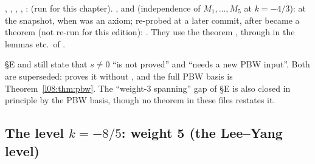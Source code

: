\begin{status}
\allowbreak{}\allowbreak{}\allowbreak{}, \allowbreak{}\allowbreak{}\allowbreak{}\allowbreak{}\allowbreak{}, \allowbreak{}\allowbreak{}\allowbreak{},
\allowbreak{}\allowbreak{}\allowbreak{}\allowbreak{}, \allowbreak{}\allowbreak{}\allowbreak{}\allowbreak{}: \lean{[propext, Classical.}\allowbreak{}\allowbreak\lean{sound]} (run for this chapter). , \allowbreak{}\allowbreak{}\allowbreak{}\allowbreak{}\allowbreak{}\allowbreak{}
and  (independence of $M_1,\ldots,M_5$ at $k=-4/3$): \lean{[propext,
Classical.}\allowbreak{}\allowbreak{}\allowbreak\lean{pbw]} at the snapshot, when  was an axiom; re-probed at a later commit, after  became a theorem (not re-run for this edition):
. They use the theorem , through 
in the lemmas  etc.\ of .
\end{status}

\begin{warning}[title={Stale ``honest gap'' notes}]
 \S E and  still state that
$s\ne0$ ``is not proved'' and ``needs a new PBW input''. Both are superseded:
\allowbreak{}\allowbreak{}\allowbreak{} proves it without , and the full PBW basis is
Theorem~\ref{l08:thm:pbw}. The ``weight-3 spanning'' gap of \S E is also closed in principle by the
PBW basis, though no theorem in these files restates it.
\end{warning}

\subsection{The level \texorpdfstring{$k=-8/5$}{k=-8/5}: weight 5 (the Lee--Yang level)}

